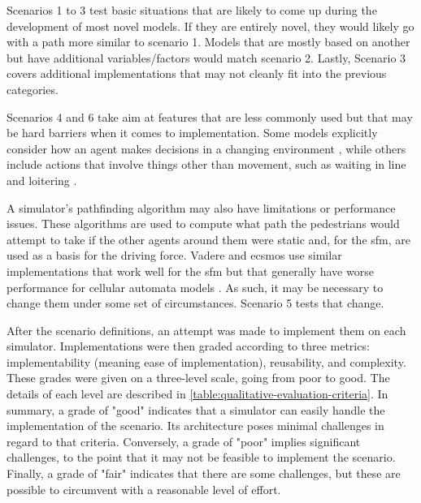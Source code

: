 \documentclass[twoside, 11pt]{article}
\begin{document}
Scenarios 1 to 3 test basic situations that are likely to come up during the development of most novel models. If they are entirely novel, they would likely go with a path more similar to scenario 1. Models that are mostly based on another but have additional variables/factors would match scenario 2. Lastly, Scenario 3 covers additional implementations that may not cleanly fit into the previous categories.



Scenarios 4 and 6 take aim at features that are less commonly used but that may be hard barriers when it comes to implementation. Some models explicitly consider how an agent makes decisions in a changing environment \cite{DEIULIIS2023104527}, while others include actions that involve things other than movement, such as waiting in line and loitering \cite{KIM2013232, ALAM2022100527}. 

A simulator's pathfinding algorithm may also have limitations or performance issues. These algorithms are used to compute what path the pedestrians would attempt to take if the other agents around them were static and, for the \acrlong{sfm}, are used as a basis for the driving force. Vadere and \gls{ecsmos} use similar implementations that work well for the \gls{sfm} but that generally have worse performance for cellular automata models \cite{kleinmeierVadereOpenSourceSimulation2019}. As such, it may be necessary to change them under some set of circumstances. Scenario 5 tests that change.

After the scenario definitions, an attempt was made to implement them on each simulator. Implementations were then graded according to three metrics: implementability (meaning ease of implementation), reusability, and complexity. These grades were given on a three-level scale, going from poor to good. The details of each level are described in \autoref{table:qualitative-evaluation-criteria}. In summary, a grade of "good" indicates that a simulator can easily handle the implementation of the scenario. Its architecture poses minimal challenges in regard to that criteria. Conversely, a grade of "poor" implies significant challenges, to the point that it may not be feasible to implement the scenario. Finally, a grade of "fair" indicates that there are some challenges, but these are possible to circumvent with a reasonable level of effort.
\end{document}
